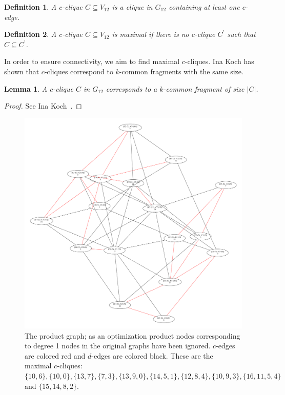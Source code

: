\documentclass[11pt]{article}
\newtheorem{definition}{Definition}[section]
\newtheorem{lemma}[theorem]{Lemma}
\begin{document}
\begin{definition}
A \emph{$c$-clique} $C \subseteq V_{12}$ is a clique in $G_{12}$ containing at
least one $c$-edge.
\end{definition}

\begin{definition}
A $c$-clique $C \subseteq V_{12}$ is \emph{maximal} if there is no
$c$-clique $C^\prime$ such that $C \subseteq C^\prime$.
\end{definition}

In order to ensure connectivity, we aim to find maximal $c$-cliques. Ina Koch
has shown that $c$-cliques correspond to $k$-common fragments with the same size.

\begin{lemma}
A $c$-clique $C$ in $G_{12}$ corresponds to a $k$-common fragment of size $|C|$.
\end{lemma}
\begin{proof}
See Ina Koch~\cite{Koch:2001wi}.
\end{proof}

\begin{figure}
  \center
  \includegraphics[width=1.1\textwidth]{images/product}
  \caption{The product graph; as an optimization product nodes corresponding to
    degree 1 nodes in the original graphs have been ignored. $c$-edges are
    colored red and $d$-edges are colored black. These are the maximal
    $c$-cliques: $\{10,6\}, \{10,0\}, \{13, 7\},
    \{7, 3\}, \{13, 9, 0\}, \{14, 5, 1\}, \{12, 8, 4\}, \{10, 9, 3\}, \{16, 11,
    5, 4\}$ and $\{15, 14, 8, 2\}$.}
  \label{fig:product}
\end{figure}
\end{document}
